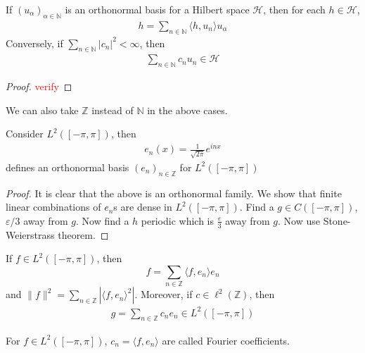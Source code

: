 \begin{corollary}
  If $(u_\alpha)_{\alpha \in \mathbb{N}}$ is an orthonormal basis for
  a Hilbert space $\mathcal{H}$,
  then for each $h \in  \mathcal{H}$,
  \begin{align*}
    h = \sum_{n \in \mathbb{N}} \langle h , u_n \rangle u_\alpha
  \end{align*}
  Conversely, if $\sum_{n \in \mathbb{N}} |c_n|^2 < \infty$, then
  \begin{align*}
    \sum_{n \in \mathbb{N}} c_n u_n \in \mathcal{H}
  \end{align*}
\end{corollary}
\begin{proof}
  \textcolor{red}{verify}
\end{proof}

\begin{remark}
  We can also take $  \mathbb{Z}$ instead of $\mathbb{N}$ in the above cases.
\end{remark}

\begin{example}
  Consider $L^2([-\pi, \pi])$, then
  \begin{align*}
    e_n(x) = \frac{1}{\sqrt{2\pi}} e^{inx}
  \end{align*}
  defines an orthonormal basis $(e_n)_{n \in \mathbb{Z}}$ for
  $L^{2}([-\pi, \pi])$
\end{example}
\begin{proof}
  It is clear that the above is an orthonormal family. We show that
  finite linear combinations of $e_n$s are dense in
  $L^{2}([-\pi, \pi])$.
  Find a $g \in C([-\pi, \pi])$, $\varepsilon/3$ away from $g$. Now
  find a $h$ periodic which is $ \frac{\varepsilon}{3}$ away from
  $g$. Now use Stone-Weierstrass theorem.
\end{proof}

\begin{corollary}
  If $f \in L^{2}([-\pi, \pi])$, then $$f = \sum_{n \in \mathbb{Z}}
  \langle f , e_n \rangle e_n$$ and $\|f\|^2 = \sum_{n \in \mathbb{Z}}
  |\langle f , e_n \rangle ^2|$.
  Moreover, if $c \in \ell^{2}(\mathbb{Z})$, then
  \begin{align*}
    g = \sum_{n \in \mathbb{Z}} c_ne_n \in L^{2}([-\pi, \pi])
  \end{align*}
\end{corollary}

\begin{remark}
  For $f \in L^{2}([-\pi, \pi])$, $c_n = \langle f , e_n \rangle$ are
  called Fourier coefficients.
\end{remark}

